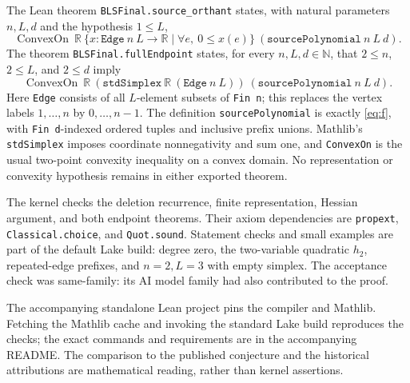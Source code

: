 \documentclass[11pt]{article}
\newcommand{\R}{\mathbb R}
\newcommand{\N}{\mathbb N}
\begin{document}
The Lean theorem \texttt{BLSFinal.source\_orthant} states, with natural
parameters $n,L,d$ and the hypothesis $1\leq L$,
\[
 \operatorname{ConvexOn}\ \R\
 \{x:\texttt{Edge}\ n\ L\to\R\mid\forall e,\ 0\leq x(e)\}\
 (\texttt{sourcePolynomial}\ n\ L\ d).
\]
The theorem \texttt{BLSFinal.fullEndpoint} states, for every $n,L,d\in\N$,
that $2\leq n$, $2\leq L$, and $2\leq d$ imply
\[
 \operatorname{ConvexOn}\ \R\
 (\texttt{stdSimplex}\ \R\ (\texttt{Edge}\ n\ L))\
 (\texttt{sourcePolynomial}\ n\ L\ d).
\]
Here \texttt{Edge} consists of all $L$-element subsets of \texttt{Fin n};
this replaces the vertex labels $1,\ldots,n$ by $0,\ldots,n-1$.
The definition \texttt{sourcePolynomial} is exactly \eqref{eq:f}, with
\texttt{Fin d}-indexed ordered tuples and inclusive prefix unions.
Mathlib's \texttt{stdSimplex} imposes coordinate nonnegativity and sum one,
and \texttt{ConvexOn} is the usual two-point convexity inequality on a
convex domain. No representation or convexity hypothesis remains in
either exported theorem.

The kernel checks the deletion recurrence, finite representation, Hessian
argument, and both endpoint theorems. Their axiom dependencies are
\texttt{propext}, \texttt{Classical.choice}, and \texttt{Quot.sound}.
Statement checks and small examples are part of the default Lake build:
degree zero, the two-variable quadratic $h_2$, repeated-edge prefixes,
and $n=2,L=3$ with empty simplex. The acceptance check was same-family:
its AI model family had also contributed to the proof.

The accompanying standalone Lean project pins the compiler and Mathlib.
Fetching the Mathlib cache and invoking the standard Lake build reproduces
the checks; the exact commands and requirements are in the accompanying
README. The comparison to the published conjecture and the historical
attributions are mathematical reading, rather than kernel assertions.
\end{document}
